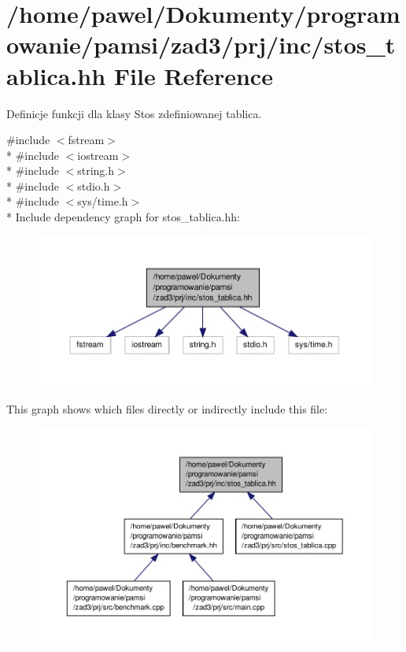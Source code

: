 \hypertarget{stos__tablica_8hh}{\section{/home/pawel/\-Dokumenty/programowanie/pamsi/zad3/prj/inc/stos\-\_\-tablica.hh File Reference}
\label{stos__tablica_8hh}
}


Definicje funkcji dla klasy Stos zdefiniowanej tablica.  


{\ttfamily \#include $<$fstream$>$}\\*
{\ttfamily \#include $<$iostream$>$}\\*
{\ttfamily \#include $<$string.\-h$>$}\\*
{\ttfamily \#include $<$stdio.\-h$>$}\\*
{\ttfamily \#include $<$sys/time.\-h$>$}\\*
Include dependency graph for stos\-\_\-tablica.\-hh\-:\nopagebreak
\begin{figure}[H]
\begin{center}
\leavevmode
\includegraphics[width=350pt]{stos__tablica_8hh__incl}
\end{center}
\end{figure}
This graph shows which files directly or indirectly include this file\-:\nopagebreak
\begin{figure}[H]
\begin{center}
\leavevmode
\includegraphics[width=350pt]{stos__tablica_8hh__dep__incl}
\end{center}
\end{figure}
